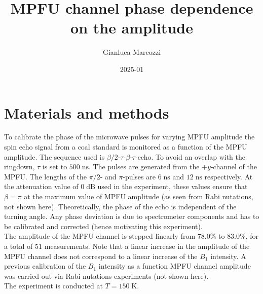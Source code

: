 \documentclass[a4paper, 11pt]{article}
\title{MPFU channel phase dependence on the amplitude}
\author{Gianluca Marcozzi}
\date{2025-01}
\begin{document}
	\maketitle
	\section*{Materials and methods}
	To calibrate the phase of the microwave pulses for varying MPFU amplitude the spin echo signal from a coal standard is monitored as a function of the MPFU amplitude. The sequence used is $\beta/2$-$\tau$-$\beta$-$\tau$-echo. To avoid an overlap with the ringdown, $\tau$ is set to $500\;\text{ns}$. The pulses are generated from the $+y$-channel of the MPFU. The lengths of the $\pi/2$- and $\pi$-pulses are $6\;\text{ns}$ and $12\;\text{ns}$ respectively. At the attenuation value of $0\;\text{dB}$ used in the experiment, these values ensure that $\beta = \pi$ at the maximum value of MPFU amplitude (as seen from Rabi nutations, not shown here). Theoretically, the phase of the echo is independent of the turning angle. Any phase deviation is due to spectrometer components and has to be calibrated and corrected (hence motivating this experiment).\\
	The amplitude of the MPFU channel is stepped linearly from $78.0\%$ to $83.0\%$, for a total of $51$ measurements. Note that a linear increase in the amplitude of the MPFU channel does not correspond to a linear increase of the $B_1$ intensity. A previous calibration of the $B_1$ intensity as a function MPFU channel amplitude was carried out via Rabi nutations experiments (not shown here).\\
	The experiment is conducted at $T = 150\;\text{K}$.
	
\end{document}
